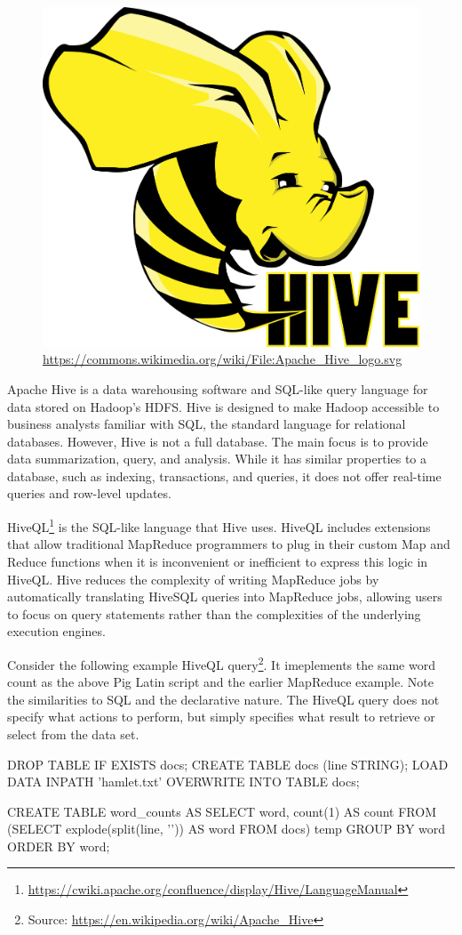 \begin{figure}
\begin{center}
\includegraphics[width=.25\textwidth]{hive_logo.png} \\
\tiny\url{https://commons.wikimedia.org/wiki/File:Apache_Hive_logo.svg}
\end{center}
\end{figure}
Apache Hive is a data warehousing software and SQL-like query language for data stored on Hadoop's HDFS. Hive is designed to make Hadoop accessible to business analysts familiar with SQL, the standard language for relational databases. However, Hive is not a full database. The main focus is to provide data summarization, query, and analysis. While it has similar properties to a database, such as indexing, transactions, and queries, it does not offer real-time queries and row-level updates.

HiveQL\footnote{\url{https://cwiki.apache.org/confluence/display/Hive/LanguageManual}} is the SQL-like language that Hive uses. HiveQL includes extensions that allow traditional MapReduce programmers to plug in their custom Map and Reduce functions when it is inconvenient or inefficient to express this logic in HiveQL. Hive reduces the complexity of writing MapReduce jobs by automatically translating HiveSQL queries into MapReduce jobs, allowing users to focus on query statements rather than the complexities of the underlying execution engines.

Consider the following example HiveQL query\footnote{\small Source: \url{https://en.wikipedia.org/wiki/Apache_Hive}}. It imeplements the same word count as the above Pig Latin script and the earlier MapReduce example. Note the similarities to SQL and the declarative nature. The HiveQL query does not specify what actions to perform, but simply specifies what result to retrieve or select from the data set. 

\begin{sqlcode}
DROP TABLE IF EXISTS docs;
CREATE TABLE docs (line STRING);
LOAD DATA INPATH 'hamlet.txt' 
  OVERWRITE INTO TABLE docs;
  
CREATE TABLE word_counts AS
SELECT word, count(1) AS count FROM
  (SELECT explode(split(line, '\s')) 
    AS word FROM docs) temp
GROUP BY word
ORDER BY word;
\end{sqlcode}


